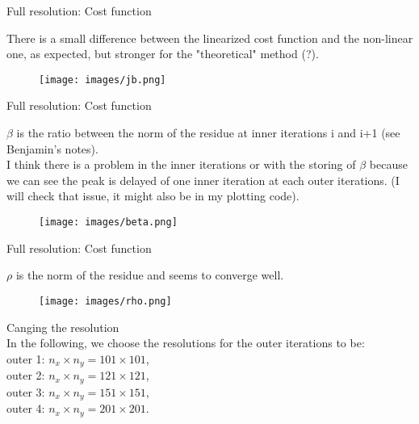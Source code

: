 \documentclass[francais]{beamer}
\begin{document}
\begin{frame}{Full resolution: Cost function}
\begin{center}
There is a small difference between the linearized cost function and the non-linear one, as expected, but stronger for the "theoretical" method (?).
\endminipage \hfill
{}%
\begin{figure}
  \texttt{[image: images/jb.png]}
\end{figure}
\endminipage
\end{center}
\end{frame}

\begin{frame}{Full resolution: Cost function}
\begin{center}
$\beta$ is the ratio between the norm of the residue at inner iterations i and i+1 (see Benjamin's notes).\\
I think there is a problem in the inner iterations or with the storing of $\beta$ because we can see the peak is delayed of one inner iteration at each outer iterations. (I will check that issue, it might also be in my plotting code).
\endminipage \hfill
{}%
\begin{figure}
  \texttt{[image: images/beta.png]}
\end{figure}
\endminipage
\end{center}
\end{frame}

\begin{frame}{Full resolution: Cost function}
\begin{center}
$\rho$ is the norm of the residue and seems to converge well.
\endminipage \hfill
{}%
\begin{figure}
  \texttt{[image: images/rho.png]}
\end{figure}
\endminipage
\end{center}
\end{frame}



\begin{frame}
\begin{center}
  {\huge Canging the resolution}\\
  \vspace{+1cm}
In the following, we choose the resolutions for the outer iterations to be:\\
outer 1: $n_x \times n_y = 101 \times 101$,\\
outer 2: $n_x \times n_y = 121 \times 121$,\\
outer 3: $n_x \times n_y = 151 \times 151$,\\
outer 4: $n_x \times n_y = 201 \times 201$.
\end{center}
\end{frame}
\end{document}
